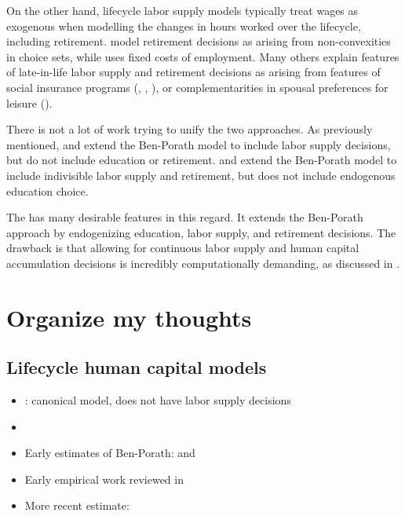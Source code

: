 \documentclass[12pt]{article}
\begin{document}
On the other hand, lifecycle labor supply models typically treat wages as exogenous when modelling the changes in hours worked over the lifecycle, including retirement.
\textcite{rosen_1976_lifecycle_human_capital} model retirement decisions as arising from non-convexities in choice sets, while \textcite{prescott_rogerson_wallenius_2009_lifetime_aggregate_labor_supply_workweek_length_fixed_costs} uses fixed costs of employment.
Many others explain features of late-in-life labor supply and retirement decisions as arising from features of social insurance programs (\textcite{rush_phelan_1997_labor_supply_incomplete_markets_social_security_medicare}, \textcite{french_2005_retirement_social_security}, \textcite{french_jones_2011_retirement_health_insurance_medicare_social_security}), or complementarities in spousal preferences for leisure (\textcite{casanova_2010_retirement_spouse}).

There is not a lot of work trying to unify the two approaches.
As previously mentioned, \textcite{heckman_1976_lifecycle_human_capital_labor_supply} and \textcite{heckman_1976_estimate_human_capital_production_function} extend the Ben-Porath model to include labor supply decisions, but do not include education or retirement.
\textcite{fan_seshadri_taber_2012_lifetime_labor_supply_human_capital} and \textcite{manuelli_seshadri_shin_2012_lifetime_labor_supply_human_capital} extend the Ben-Porath model to include indivisible labor supply and retirement, but does not include endogenous education choice.

The \textcite{blinder_weiss_1976_lifecycle_human_capital_labor_supply_synthesis} has many desirable features in this regard.
It extends the Ben-Porath approach by endogenizing education, labor supply, and retirement decisions.
The drawback is that allowing for continuous labor supply and human capital accumulation decisions is incredibly computationally demanding, as discussed in \textcite{imai_keane_2004_lifecycle_labor_supply_human_capital_accumulation}.

\iffalse
\section{Organize my thoughts}
\subsection{Lifecycle human capital models}
\begin{itemize}
    \item \textcite{ben-porath_1976_human_capital_lifecycle_earnings}: canonical model, does not have labor supply decisions
    \item \textcite{kuruscu_2006_lifecycle_training}
    \item Early estimates of Ben-Porath: \textcite{rosen_1976_lifecycle_human_capital} and \textcite{haley_1976_lifecycle_human_capital}
    \item Early empirical work reviewed in \textcite{browning_hansen_heckman_1999_micro_data_ge_models}
    \item More recent estimate: \textcite{kuruscu_2006_lifecycle_training}
\end{itemize}
\end{document}
